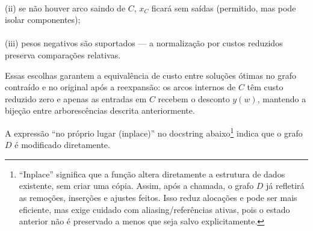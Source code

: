 \documentclass[12pt,a4paper]{article}
\def\emph#1{#1}%
\begin{document}
\begin{itemize}
    \paragraph{}
    (ii) se não houver arco saindo de \(C\), \(x_C\) ficará sem saídas (permitido, mas pode isolar componentes); 
    \paragraph{}
    (iii) pesos negativos são suportados — a normalização por custos reduzidos preserva comparações relativas.
\end{itemize}

Essas escolhas garantem a \emph{equivalência de custo} entre soluções ótimas no grafo contraído e no original após a reexpansão: os arcos internos de \(C\) têm custo reduzido zero e apenas as entradas em \(C\) recebem o desconto \(y(w)\), mantendo a bijeção entre arborescências descrita anteriormente.


\noindent A expressão “no próprio lugar (in\-place)” no docstring abaixo\footnote{“In\-place” significa que a função altera diretamente a estrutura de dados existente, sem criar uma cópia. Assim, após a chamada, o grafo \(D\) já refletirá as remoções, inserções e ajustes feitos. Isso reduz alocações e pode ser mais eficiente, mas exige cuidado com aliasing/referências ativas, pois o estado anterior não é preservado a menos que seja salvo explicitamente.} indica que o grafo \(D\) é modificado diretamente.
\end{document}
